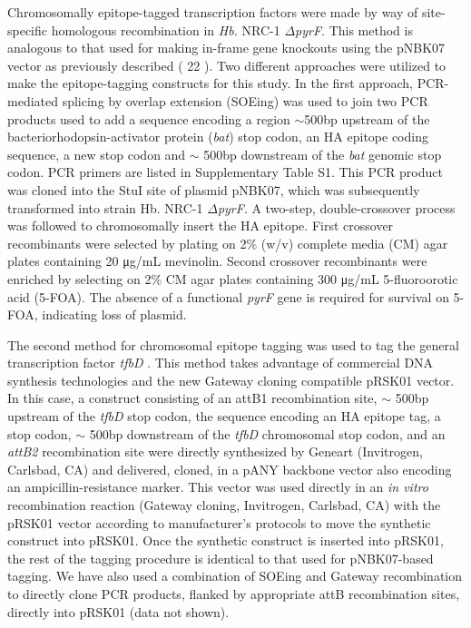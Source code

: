 Chromosomally epitope-tagged transcription factors were made by way of site-specific homologous recombination in {\em Hb.} NRC-1 $\Delta${\em pyrF}. This method is analogous to that used for making in-frame gene knockouts using the pNBK07 vector as previously described ( 22 ). Two different approaches were utilized to make the epitope-tagging constructs for this study. In the first approach, PCR-mediated splicing by overlap extension (SOEing) \cite{horton1989engineering} was used to join two PCR products used to add a sequence encoding a region $\sim$500bp upstream of the bacteriorhodopsin-activator protein ({\em bat}) stop codon, an HA epitope coding sequence, a new stop codon and $\sim$ 500bp downstream of the {\em bat} genomic stop codon. PCR primers are listed in Supplementary Table S1. This PCR product was cloned into the StuI site of plasmid pNBK07, which was subsequently transformed into strain Hb. NRC-1 $\Delta${\em pyrF}. A two-step, double-crossover process was followed to chromosomally insert the HA epitope. First crossover recombinants were selected by plating on 2\% (w/v) complete media (CM) agar plates containing 20 \si{\micro\gram}/\si{\milli\liter} mevinolin. Second crossover recombinants were enriched by selecting on 2\% CM agar plates containing 300 \si{\micro\gram}/\si{\milli\liter} 5-fluoroorotic acid (5-FOA). The absence of a functional  {\em pyrF}  gene is required for survival on 5-FOA, indicating loss of plasmid.

The second method for chromosomal epitope tagging was used to tag the general transcription factor  {\em tfbD} . This method takes advantage of commercial DNA synthesis technologies and the new Gateway cloning compatible pRSK01 vector. In this case, a construct consisting of an attB1 recombination site, $\sim$ 500bp upstream of the  {\em tfbD}  stop codon, the sequence encoding an HA epitope tag, a stop codon, $\sim$ 500bp downstream of the  {\em tfbD}  chromosomal stop codon, and an {\em attB2} recombination site were directly synthesized by Geneart (Invitrogen, Carlsbad, CA) and delivered, cloned, in a pANY backbone vector also encoding an ampicillin-resistance marker. This vector was used directly in an {\em in vitro} recombination reaction (Gateway cloning, Invitrogen, Carlsbad, CA) with the pRSK01 vector according to manufacturer's protocols to move the synthetic construct into pRSK01. Once the synthetic construct is inserted into pRSK01, the rest of the tagging procedure is identical to that used for pNBK07-based tagging. We have also used a combination of SOEing and Gateway recombination to directly clone PCR products, flanked by appropriate attB recombination sites, directly into pRSK01 (data not shown).

